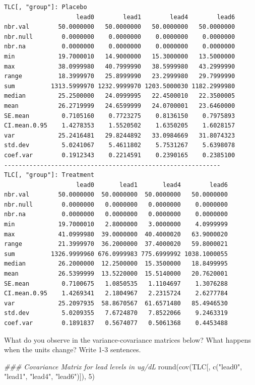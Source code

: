 \documentclass[
  letterpaper,
  DIV=11,
  numbers=noendperiod]{scrreprt}
\newenvironment{Shaded}{\begin{snugshade}}{\end{snugshade}}
\newcommand{\DecValTok}[1]{\textcolor[rgb]{0.68,0.00,0.00}{#1}}
\newcommand{\DocumentationTok}[1]{\textcolor[rgb]{0.37,0.37,0.37}{\textit{#1}}}
\newcommand{\FunctionTok}[1]{\textcolor[rgb]{0.28,0.35,0.67}{#1}}
\newcommand{\NormalTok}[1]{\textcolor[rgb]{0.00,0.23,0.31}{#1}}
\newcommand{\StringTok}[1]{\textcolor[rgb]{0.13,0.47,0.30}{#1}}
\begin{document}
\begin{verbatim}
TLC[, "group"]: Placebo
                    lead0        lead1        lead4        lead6
nbr.val        50.0000000   50.0000000   50.0000000   50.0000000
nbr.null        0.0000000    0.0000000    0.0000000    0.0000000
nbr.na          0.0000000    0.0000000    0.0000000    0.0000000
min            19.7000010   14.9000000   15.3000000   13.5000000
max            38.0999980   40.7999990   38.5999980   43.2999990
range          18.3999970   25.8999990   23.2999980   29.7999990
sum          1313.5999970 1232.9999970 1203.5000030 1182.2999980
median         25.2500000   24.0999995   22.4500010   22.3500005
mean           26.2719999   24.6599999   24.0700001   23.6460000
SE.mean         0.7105160    0.7723275    0.8136150    0.7975893
CI.mean.0.95    1.4278353    1.5520502    1.6350205    1.6028157
var            25.2416481   29.8244892   33.0984669   31.8074323
std.dev         5.0241067    5.4611802    5.7531267    5.6398078
coef.var        0.1912343    0.2214591    0.2390165    0.2385100
------------------------------------------------------------ 
TLC[, "group"]: Treatment
                    lead0       lead1       lead4        lead6
nbr.val        50.0000000  50.0000000  50.0000000   50.0000000
nbr.null        0.0000000   0.0000000   0.0000000    0.0000000
nbr.na          0.0000000   0.0000000   0.0000000    0.0000000
min            19.7000010   2.8000000   3.0000000    4.0999999
max            41.0999980  39.0000000  40.4000020   63.9000020
range          21.3999970  36.2000000  37.4000020   59.8000021
sum          1326.9999960 676.0999983 775.6999992 1038.1000055
median         26.2000000  12.2500000  15.3500000   18.8499995
mean           26.5399999  13.5220000  15.5140000   20.7620001
SE.mean         0.7100675   1.0850535   1.1104697    1.3076288
CI.mean.0.95    1.4269341   2.1804967   2.2315724    2.6277784
var            25.2097935  58.8670567  61.6571480   85.4946530
std.dev         5.0209355   7.6724870   7.8522066    9.2463319
coef.var        0.1891837   0.5674077   0.5061368    0.4453488
\end{verbatim}

What do you observe in the variance-covariance matrices below? What
happens when the units change? Write 1-3 sentences.

\begin{Shaded}
\begin{Highlighting}[]
\DocumentationTok{\#\#\# Covariance Matrix for lead levels in ug/dL}
\FunctionTok{round}\NormalTok{(}\FunctionTok{cov}\NormalTok{(TLC[, }\FunctionTok{c}\NormalTok{(}\StringTok{"lead0"}\NormalTok{, }\StringTok{"lead1"}\NormalTok{, }\StringTok{"lead4"}\NormalTok{, }\StringTok{"lead6"}\NormalTok{)]), }\DecValTok{5}\NormalTok{)}
\end{Highlighting}
\end{Shaded}
\end{document}
